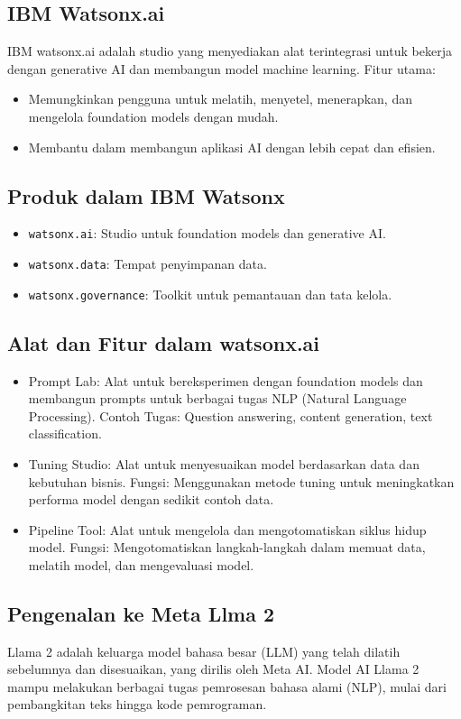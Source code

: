 \documentclass{article}
\begin{document}
\subsection{IBM Watsonx.ai}
IBM watsonx.ai adalah studio yang menyediakan alat terintegrasi untuk bekerja dengan generative AI dan membangun model machine learning. Fitur utama:
\begin{itemize}
    \item Memungkinkan pengguna untuk melatih, menyetel, menerapkan, dan mengelola foundation models dengan mudah.
    \item Membantu dalam membangun aplikasi AI dengan lebih cepat dan efisien.
\end{itemize}

\subsection{Produk dalam IBM Watsonx}
\begin{itemize}
    \item \verb|watsonx.ai|: Studio untuk foundation models dan generative AI.
    \item \verb|watsonx.data|: Tempat penyimpanan data.
    \item \verb|watsonx.governance|: Toolkit untuk pemantauan dan tata kelola.
\end{itemize}

\subsection{Alat dan Fitur dalam watsonx.ai}
\begin{itemize}
    \item Prompt Lab: Alat untuk bereksperimen dengan foundation models dan membangun prompts untuk berbagai tugas NLP (Natural Language Processing). Contoh Tugas: Question answering, content generation, text classification.
    \item Tuning Studio: Alat untuk menyesuaikan model berdasarkan data dan kebutuhan bisnis. Fungsi: Menggunakan metode tuning untuk meningkatkan performa model dengan sedikit contoh data.
    \item Pipeline Tool: Alat untuk mengelola dan mengotomatiskan siklus hidup model. Fungsi: Mengotomatiskan langkah-langkah dalam memuat data, melatih model, dan mengevaluasi model.
\end{itemize}

\subsection{Pengenalan ke Meta Llma 2}
Llama 2 adalah keluarga model bahasa besar (LLM) yang telah dilatih sebelumnya dan disesuaikan, yang dirilis oleh Meta AI. Model AI Llama 2 mampu melakukan berbagai tugas pemrosesan bahasa alami (NLP), mulai dari pembangkitan teks hingga kode pemrograman.
\end{document}
